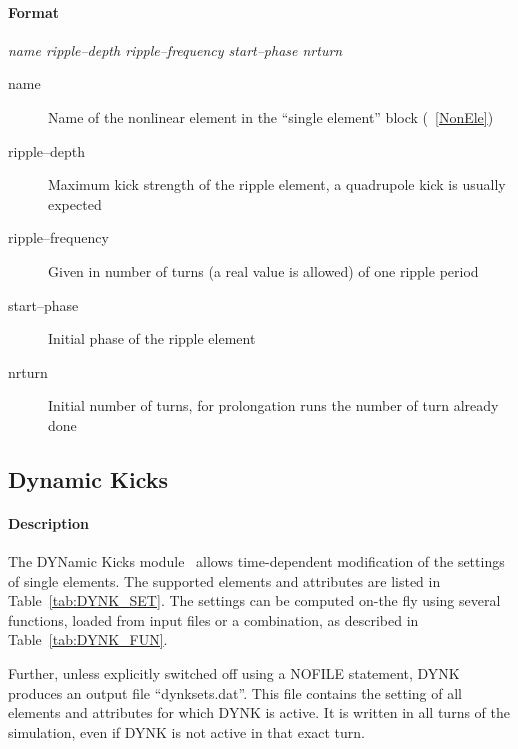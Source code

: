 \documentclass[a4paper,11pt]{report}
\begin{document}
\paragraph{Format} {\em name ripple--depth ripple--frequency start--phase nrturn}

\begin{description}
\item [name] Name of the nonlinear element in the ``single element''
  block (~\ref{NonEle})
\item [ripple--depth] Maximum kick strength of the ripple element, a
  quadrupole kick is usually expected
\item [ripple--frequency] Given in number of turns (a real value is
  allowed) of one ripple period
\item [start--phase] Initial phase of the ripple element
\item [nrturn] Initial number of turns, for prolongation runs the
  number of turn already done
\end{description}


\subsection{Dynamic Kicks}
\label{sec:DYNK}

\paragraph{Description}
The DYNamic Kicks module~\cite{DYNKpaper} allows time-dependent modification of the settings of single elements.
The supported elements and attributes are listed in Table~\ref{tab:DYNK_SET}.
The settings can be computed on-the fly using several functions, loaded from input files or a combination, as described in Table~\ref{tab:DYNK_FUN}.

Further, unless explicitly switched off using a NOFILE statement, DYNK produces an output file ``dynksets.dat''.
This file contains the setting of all elements and attributes for which DYNK is active.
It is written in all turns of the simulation, even if DYNK is not active in that exact turn.
\end{document}
